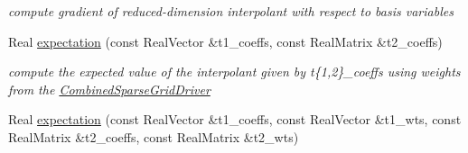 \begin{DoxyCompactItemize}
\begin{DoxyCompactList}\small\item\em compute gradient of reduced-\/dimension interpolant with respect to basis variables \end{DoxyCompactList}\item 
Real \hyperlink{classPecos_1_1NodalInterpPolyApproximation_a4057786fc84fcd04ea07744a0a928b4a}{expectation} (const Real\+Vector \&t1\+\_\+coeffs, const Real\+Matrix \&t2\+\_\+coeffs)\label{classPecos_1_1NodalInterpPolyApproximation_a4057786fc84fcd04ea07744a0a928b4a}

\begin{DoxyCompactList}\small\item\em compute the expected value of the interpolant given by t\{1,2\}\+\_\+coeffs using weights from the \hyperlink{classPecos_1_1CombinedSparseGridDriver}{Combined\+Sparse\+Grid\+Driver} \end{DoxyCompactList}\item 
Real \hyperlink{classPecos_1_1NodalInterpPolyApproximation_ae0468e01d194de5eeecc306be0e9ab4e}{expectation} (const Real\+Vector \&t1\+\_\+coeffs, const Real\+Vector \&t1\+\_\+wts, const Real\+Matrix \&t2\+\_\+coeffs, const Real\+Matrix \&t2\+\_\+wts)\label{classPecos_1_1NodalInterpPolyApproximation_ae0468e01d194de5eeecc306be0e9ab4e}


\end{DoxyCompactItemize}
